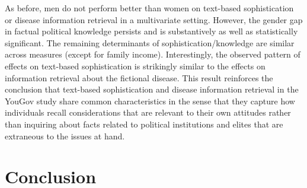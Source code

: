 \documentclass[12pt]{article}
\begin{document}
As before, men do not perform better than women on text-based sophistication or disease information retrieval in a multivariate setting. However, the gender gap in factual political knowledge persists and is substantively as well as statistically significant. The remaining determinants of sophistication/knowledge are similar across measures (except for family income). Interestingly, the observed pattern of effects on text-based sophistication is strikingly similar to the effects on information retrieval about the fictional disease. This result reinforces the conclusion that text-based sophistication and disease information retrieval in the YouGov study share common characteristics in the sense that they capture how individuals recall considerations that are relevant to their own attitudes rather than inquiring about facts related to political institutions and elites that are extraneous to the issues at hand.





\section*{Conclusion}
\end{document}
